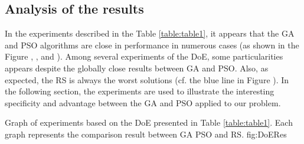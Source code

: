 

\subsection{Analysis of the results }
In the experiments described in the Table \ref{table:table1}, it appears that the GA and PSO algorithms are close in performance in numerous cases (as shown in the Figure , ,  and ). Among several experiments of the DoE, some particularities appears despite the globally close results between GA and PSO. Also, as expected, the RS is always the worst solutions (cf. the blue line  in Figure ).
 In the following section, the experiments are used to illustrate the interesting specificity and advantage between the GA and PSO applied to our problem.
\newpage 
 \begin{mfigures}[H]{Graph of experiments  based on the DoE presented in Table \ref{table:table1}. Each graph represents the comparison result between GA PSO and RS.  }{fig:DoERes} \centering
{}
\hspace{0.5cm}
\hspace{0.6cm}
\hspace{.6cm}

\end{mfigures}   


